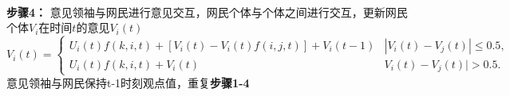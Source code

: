\documentclass{ctexart}
\begin{document}
\begin{algorithm}[H]
\begin{algorithmic}[1]
\begin{equation*}
\begin{aligned}
                        \end{aligned}
                    \end{equation*}
                \State \textbf{步骤4：} 意见领袖与网民进行意见交互，网民个体与个体之间进行交互，更新网民个体$V_i$在时间$t$的意见$V_i(t)$\\
                    \[V_i(t)=\begin{cases}
                        U_i(t)f(k,i,t)+[V_i(t)-V_i(t)f(i,j,t)]+V_i(t-1)&|V_i(t)-V_j(t)|\leq 0.5,\\
                        U_i(t)f(k,i,t)+V_i(t)&V_i(t)-V_j(t)| > 0.5.
                    \end{cases}\]
                \State 意见领袖与网民保持t-1时刻观点值，重复\textbf{步骤1-4}
                \EndIf
            \EndFor
			
		\end{algorithmic}
	\end{algorithm}
	
\end{document}

